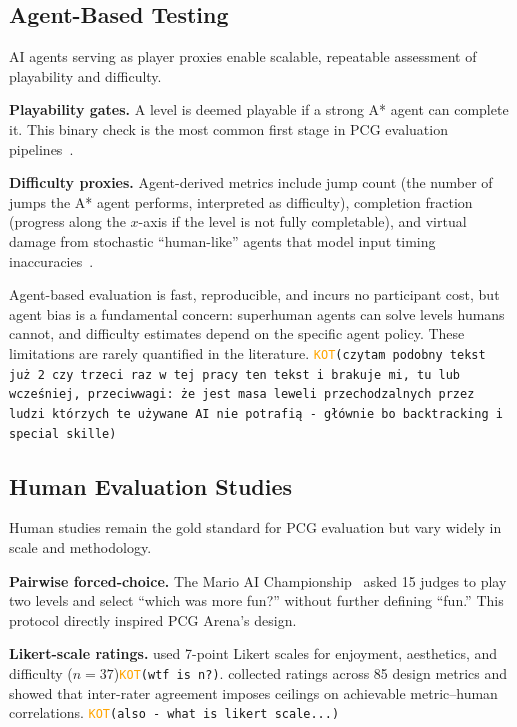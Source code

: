 \documentclass[shortabstract, mgr, english]{iithesis}
\newcommand{\DEBUG}[1]{{#1}} %
\newcommand{\KOT}[1]{\DEBUG{\tt{\textcolor{orange}{KOT}(}{#1}{)}}}
\begin{document}
\subsection{Agent-Based Testing}
\label{subsec:bg-eval-agents}

AI agents serving as player proxies enable scalable, repeatable assessment of
playability and difficulty.

\textbf{Playability gates.} A level is deemed playable if a strong A* agent can
complete it. This binary check is the most common first stage in PCG evaluation
pipelines~\citep{volz2018evolving, summerville2016super, khalifa2020pcgrl}.

\textbf{Difficulty proxies.} Agent-derived metrics include jump count (the
number of jumps the A* agent performs, interpreted as difficulty), completion
fraction (progress along the $x$-axis if the level is not fully completable),
and virtual damage from stochastic ``human-like'' agents that model input timing
inaccuracies~\citep{nam2024using}.

Agent-based evaluation is fast, reproducible, and incurs no participant cost, but
agent bias is a fundamental concern: superhuman agents can solve levels humans
cannot, and difficulty estimates depend on the specific agent policy. These
limitations are rarely quantified in the literature.
\KOT{czytam podobny tekst już 2 czy trzeci raz w tej pracy ten tekst i brakuje mi, tu lub wcześniej, przeciwwagi: że jest masa leweli przechodzalnych przez ludzi którzych te używane AI nie potrafią - głównie bo backtracking i special skille}

\subsection{Human Evaluation Studies}
\label{subsec:bg-eval-human}

Human studies remain the gold standard for PCG evaluation but vary widely in
scale and methodology.

\textbf{Pairwise forced-choice.} The Mario AI
Championship~\citep{shaker2011mario} asked 15 judges to play two levels and
select ``which was more fun?'' without further defining ``fun.'' This protocol
directly inspired PCG Arena's design.

\textbf{Likert-scale ratings.} \citet{marino2015empirical} used 7-point Likert
scales for enjoyment, aesthetics, and difficulty ($n = 37$)\KOT{wtf is n?}.
\citet{summerville2017understanding} collected ratings across 85 design metrics
and showed that inter-rater agreement imposes ceilings on achievable
metric--human correlations.
\KOT{also - what is likert scale...}
\end{document}

